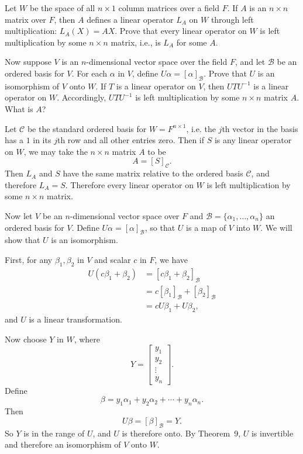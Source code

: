  Let $W$ be the space of all $n\times1$ column matrices
over a field $F$. If $A$ is an $n\times n$ matrix over $F$, then $A$
defines a linear operator $L_A$ on $W$ through left multiplication:
$L_A(X) = AX$. Prove that every linear operator on $W$ is left
multiplication by some $n\times n$ matrix, i.e., is $L_A$ for some
$A$.

Now suppose $V$ is an $n$-dimensional vector space over the field $F$,
and let $\mathcal{B}$ be an ordered basis for $V$. For each $\alpha$
in $V$, define $U\alpha = [\alpha]_{\mathcal{B}}$. Prove that $U$ is
an isomorphism of $V$ onto $W$. If $T$ is a linear operator on $V$,
then $UTU^{-1}$ is a linear operator on $W$. Accordingly, $UTU^{-1}$
is left multiplication by some $n\times n$ matrix $A$. What is $A$?
\begin{solution}
  Let $\mathcal{C}$ be the standard ordered basis for
  $W = F^{n\times1}$, i.e. the $j$th vector in the basis has a $1$ in
  its $j$th row and all other entries zero. Then if $S$ is any linear
  operator on $W$, we may take the $n\times n$ matrix $A$ to be
  \begin{equation*}
    A = [S]_{\mathcal{C}}.
  \end{equation*}
  Then $L_A$ and $S$ have the same matrix relative to the ordered
  basis $\mathcal{C}$, and therefore $L_A = S$. Therefore every linear
  operator on $W$ is left multiplication by some $n\times n$ matrix.

  Now let $V$ be an $n$-dimensional vector space over $F$ and
  $\mathcal{B} = \{\alpha_1,\dots,\alpha_n\}$ an ordered basis for
  $V$. Define $U\alpha = [\alpha]_{\mathcal{B}}$, so that $U$ is a map
  of $V$ into $W$. We will show that $U$ is an isomorphism.

  First, for any $\beta_1,\beta_2$ in $V$ and scalar $c$ in $F$, we
  have
  \begin{align*}
    U(c\beta_1 + \beta_2)
    &= [c\beta_1 + \beta_2]_{\mathcal{B}} \\
    &= c[\beta_1]_{\mathcal{B}} + [\beta_2]_{\mathcal{B}} \\
    &= cU\beta_1 + U\beta_2,
  \end{align*}
  and $U$ is a linear transformation.

  Now choose $Y$ in $W$, where
  \begin{equation*}
    Y =
    \begin{bmatrix}
      y_1 \\
      y_2 \\
      \vdots \\
      y_n
    \end{bmatrix}.
  \end{equation*}
  Define
  \begin{equation*}
    \beta = y_1\alpha_1 + y_2\alpha_2 + \cdots + y_n\alpha_n.
  \end{equation*}
  Then
  \begin{equation*}
    U\beta = [\beta]_{\mathcal{B}} = Y.
  \end{equation*}
  So $Y$ is in the range of $U$, and $U$ is therefore onto. By
  Theorem~9, $U$ is invertible and therefore an isomorphism of $V$
  onto $W$.


\end{solution}

